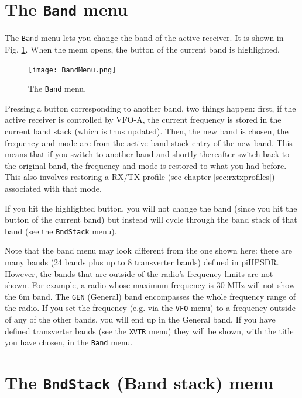 \documentclass[12pt]{book}
\def\rett#1{\texttt{\color{red}#1}}
\def\bltt#1{\texttt{\color{blue}#1}}
\def\pH{pi\-HPSDR\xspace}
\begin{document}
\section{The \texttt{Band} menu}
\label{sec:bandmenu}
The \bltt{Band} menu lets you change the band of the active receiver. It is shown
in Fig. \ref{fig:BandMenu}. When the menu opens, the button of the current band
is highlighted.

\begin{figure}[ht]
\center
\texttt{[image: BandMenu.png]}
\caption{The \bltt{Band} menu.}
\label{fig:BandMenu}
\end{figure}

Pressing a button corresponding to another band, two things happen: first, if the
active receiver is controlled by VFO-A, the current frequency is stored in the current
band stack (which is thus updated). Then, the new band is chosen, the frequency and mode
are from the active band stack entry of the new band. This means that if you switch
to another band and shortly thereafter switch back to the original band, the
frequency and mode is restored to what you had before. This also involves restoring
a RX/TX profile (see chapter \ref{sec:rxtxprofiles}) associated with that mode.

If you hit the highlighted button, you will not change the band (since you hit the
button of the current band) but instead will cycle through the band stack of that band
(see the \bltt{BndStack} menu).


Note that the band menu may look different from the one shown here: there are many bands
(24 bands plus up to 8 transverter bands) defined in \pH. However, the bands that
are outside of the radio's frequency limits are not shown. For example, a radio
whose maximum frequency is 30 MHz will not show the 6m band. The \rett{GEN} (General)
band encompasses the whole frequency range of the radio. If you set the frequency
(e.g. via the \bltt{VFO} menu) to a frequency outside of any of the other bands, you
will end up in the General band. If you have defined transverter bands (see the
\bltt{XVTR} menu) they will be shown, with the title you have chosen, in the
\bltt{Band} menu.

\section{The  \texttt{BndStack} (Band stack) menu}
\end{document}
